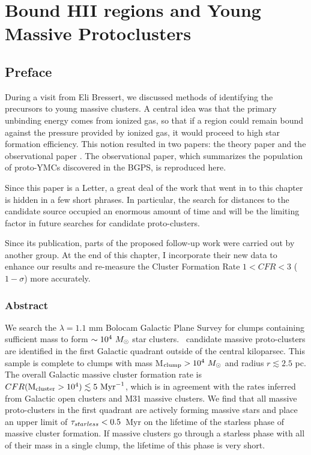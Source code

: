 
%
\chapter{Bound HII regions and Young Massive Protoclusters}
\label{ch:ympc}



\section{Preface}
During a visit from Eli Bressert, we discussed methods of identifying the
precursors to young massive clusters.  A central idea was that the primary
unbinding energy comes from ionized gas, so that if a region could remain
bound against the pressure provided by ionized gas, it would proceed to
high star formation efficiency.  This notion resulted in two papers: the theory
paper \citep{Bressert2012} and the observational paper \citep{Ginsburg2012a}.
The observational paper, which summarizes the population of proto-YMCs discovered
in the BGPS, is reproduced here.

Since this paper is a Letter, a great deal of the work that went in to this
chapter is hidden in a few short phrases.  In particular, the search for
distances to the candidate source occupied an enormous amount of time and will
be the limiting factor in future searches for candidate proto-clusters.

Since its publication, parts of the proposed follow-up work were carried out by
another group.  At the end of this chapter, I incorporate their new data to
enhance our results and re-measure the Cluster Formation Rate $1 < CFR < 3$
\permyr ($1-\sigma$) more accurately.

\subsection{Abstract}
    
We search the $\lambda=1.1$ mm Bolocam Galactic Plane Survey for clumps
containing sufficient mass to form $\sim10^4~M_{\odot}$ star clusters.
\ncandidates\ candidate massive proto-clusters  are identified in the first Galactic quadrant outside
of the central kiloparsec.  This
sample is complete to clumps with mass M$_{\rm clump}>10^4~M_{\odot}$ and radius
$r\lesssim2.5$ pc.  The overall Galactic massive cluster formation rate is
$CFR({\rm M}_{\rm cluster}>10^4) \lesssim 5\  \mathrm{Myr}^{-1}$, which is in
agreement with the rates inferred from Galactic open clusters and M31 massive
clusters.  We find that all massive proto-clusters in the first quadrant are
actively forming massive stars and place an upper limit of
$\tau_{starless}<0.5$~Myr on the lifetime of the starless phase of massive
cluster formation.  If massive clusters go through a starless phase with all 
of their mass in a single clump, the lifetime of this phase is very short.




